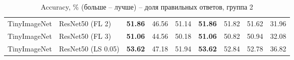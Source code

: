 \begin{table}[h!]
{\begin{tabular}{llccccccc}
TinyImageNet &             ResNet50 (FL 2) & \textbf{51.86} &                  46.56 &                  51.14 & \textbf{51.86} &                  51.82 &                  51.62 &                  31.96 \\
TinyImageNet &             ResNet50 (FL 3) & \textbf{51.06} &                  44.56 &                  50.18 & \textbf{51.06} &                  50.82 &                  50.94 &                  32.08 \\
TinyImageNet &          ResNet50 (LS 0.05) & \textbf{53.62} &                  47.18 &                  51.94 & \textbf{53.62} &                  52.84 &                  52.78 &                  36.82 \\
\bottomrule
\end{tabular}%
}
\caption{Accuracy, \% (больше -- лучше) -- доля правильных ответов, группа 2}
\label{tab:metrics:ACC_2}
\end{table}
